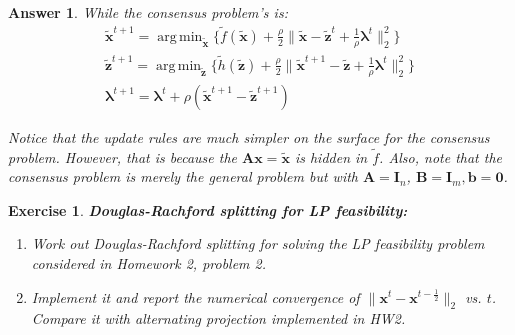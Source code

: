 \documentclass[12pt]{article}
\DeclareMathOperator*{\argmin}{arg\,min}
\theoremstyle{colon}
\newtheorem{exercise}{Exercise}
\newtheorem*{answer}{Answer}
\begin{document}
\begin{answer}
	While the consensus problem's is:
	\begin{gather*}
		\tilde{\bm{x}}^{t+1} = \argmin_{\tilde{\bm{x}}} \{ \tilde{f}(\tilde{\bm{x}}) + \frac{\rho}{2} \lVert \tilde{\bm{x}} - \tilde{\bm{z}}^t + \frac{1}{\rho} \bm{\lambda}^t \rVert_2^2 \} \\
		\tilde{\bm{z}}^{t+1} = \argmin_{\tilde{\bm{z}}} \{ \tilde{h}(\tilde{\bm{z}}) + \frac{\rho}{2} \lVert \tilde{\bm{x}}^{t+1} - \tilde{\bm{z}} + \frac{1}{\rho} \bm{\lambda}^t \rVert_2^2 \} \\
		\bm{\lambda}^{t+1} = \bm{\lambda}^t + \rho (\tilde{\bm{x}}^{t+1} - \tilde{\bm{z}}^{t+1})
	\end{gather*}

	Notice that the update rules are much simpler on the surface for the consensus problem. However, that is because the $\bm{A}\bm{x} = \tilde{\bm{x}}$ is hidden in $\tilde{f}$. Also, note that the consensus problem is merely the general problem but with $\bm{A} = \bm{I}_n$, $\bm{B} = \bm{I}_m, \bm{b} = \bm{0}$.
\end{answer}

\clearpage

\begin{exercise}
	\textbf{Douglas-Rachford splitting for LP feasibility:}
	\begin{enumerate}[label=\alph*)]
		\item Work out Douglas-Rachford splitting for solving the LP feasibility problem considered in Homework 2, problem 2.
		\item Implement it and report the numerical convergence of $\lVert \bm{x}^t - \bm{x}^{t-\frac{1}{2}} \rVert_2$ vs. $t$. Compare it with alternating projection implemented in HW2.
	\end{enumerate}
\end{exercise}
\end{document}
